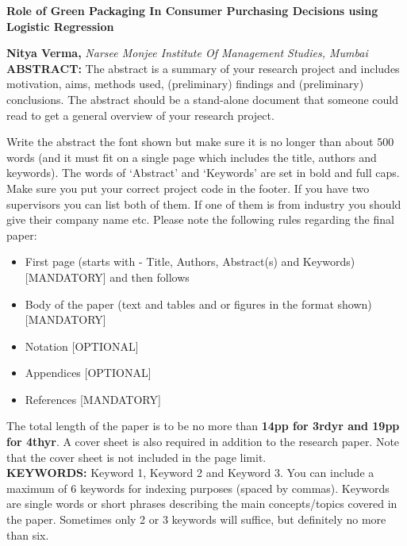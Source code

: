 \documentclass[a4paper,10pt]{article}
\begin{document}
\noindent 
\begin{center}
\textbf{{\Large Role of Green Packaging In Consumer Purchasing Decisions using Logistic Regression}} \\
\end{center}

\noindent 
\textbf{Nitya Verma,} \textit{Narsee Monjee Institute Of Management Studies, Mumbai}\\

\noindent 
\textbf{ABSTRACT: } The abstract is a summary of your research project and includes motivation, aims, methods used, (preliminary) findings and (preliminary) conclusions.  The abstract should be a stand-alone document that someone could read to get a general overview of your research project.  

Write the abstract the font shown but make sure it is no longer than about 500 words (and it must fit on a single page which includes the title, authors and keywords). The words of ‘Abstract’ and ‘Keywords’ are set in bold and full caps.  Make sure you put your correct project code in the footer. If you have two supervisors you can list both of them.  If one of them is from industry you should give their company name etc.
Please note the following rules regarding the final paper:
\begin{itemize}
    \item First page (starts with - Title, Authors, Abstract(s) and Keywords) [MANDATORY] and then follows
    \item Body of the paper (text and tables and or figures in the format shown) [MANDATORY]
    \item Notation [OPTIONAL]
    \item Appendices [OPTIONAL]
    \item References [MANDATORY]
\end{itemize}

The total length of the paper is to be no more than \textbf{14pp for 3rdyr and 19pp for 4thyr}. A cover sheet is also required in addition to the research paper. Note that the cover sheet is not included in the page limit.
\\

\noindent 
\textbf{KEYWORDS:} Keyword 1, Keyword 2 and Keyword 3. You can include a maximum of 6 keywords for indexing purposes (spaced by commas). Keywords are single words or short phrases describing the main concepts/topics covered in the paper. Sometimes only 2 or 3 keywords will suffice, but definitely no more than six.\\
\end{document}
